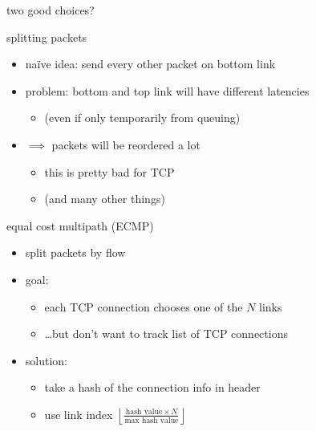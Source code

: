 \begin{frame}[fragile]{two good choices?}
\end{frame}

\begin{frame}{splitting packets}
    \begin{itemize}
    \item na\"ive idea: send every other packet on bottom link
    \vspace{.5cm}
    \item problem: bottom and top link will have different latencies
        \begin{itemize}
        \item (even if only temporarily from queuing)
        \end{itemize}
    \item $\implies$ packets will be reordered a lot
        \begin{itemize}
        \item this is pretty bad for TCP
        \item (and many other things)
        \end{itemize}
    \end{itemize}
\end{frame}

\begin{frame}{equal cost multipath (ECMP)}
    \begin{itemize}
    \item split packets by flow
    \item goal:
        \begin{itemize}
        \item each TCP connection chooses one of the $N$ links
        \item \ldots but don't want to track list of TCP connections
        \end{itemize}
    \item solution:
        \begin{itemize}
        \item take a hash of the connection info in header
        \item use link index $\left\lfloor\frac{\text{hash value} \times N}{\text{max hash value}}\right\rfloor$ 
        \end{itemize}
    \end{itemize}
\end{frame}
